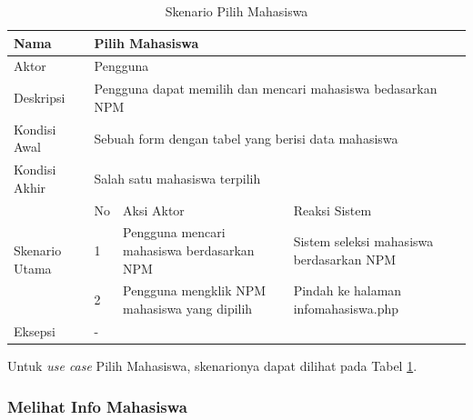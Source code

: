 \begin{table}
\centering
\caption[Tabel Skenario Pilih Mahasiswa]{Skenario Pilih Mahasiswa}
\label{tab:skenariopilih}
\begin{tabular}{|p{1.4cm}|p{0.4cm}|p{2cm}|p{2cm}|p{2cm}|p{2cm}|}
\hline
Nama & \multicolumn{5}{p{8cm}|}{Pilih Mahasiswa} \\ \hline
Aktor & \multicolumn{5}{p{8cm}|}{Pengguna} \\ \hline
Deskripsi & \multicolumn{5}{p{8cm}|}{Pengguna dapat memilih dan mencari
mahasiswa bedasarkan NPM} \\ \hline
Kondisi Awal & \multicolumn{5}{p{8cm}|}{Sebuah form dengan tabel yang berisi
data mahasiswa} \\ \hline
Kondisi Akhir & \multicolumn{5}{p{8cm}|}{Salah satu mahasiswa terpilih} \\ \hline
\multirow{3}{*}{\parbox{1.4cm}{Skenario Utama}} & No &
\multicolumn{2}{p{4cm}|}{Aksi Aktor} & \multicolumn{2}{p{4cm}|}{Reaksi Sistem}
\\ \cline{2-6}
& 1 & \multicolumn{2}{p{4cm}|}{Pengguna mencari mahasiswa berdasarkan NPM} &
\multicolumn{2}{p{4cm}|}{Sistem seleksi mahasiswa berdasarkan NPM} \\ \cline{2-6}
& 2 & \multicolumn{2}{p{4cm}|}{Pengguna mengklik NPM mahasiswa yang dipilih} &
\multicolumn{2}{p{4cm}|}{Pindah ke halaman infomahasiswa.php} \\ \hline
Eksepsi & \multicolumn{5}{p{8cm}|}{-} \\ \hline
\end{tabular}
\end{table}

Untuk {\it use case} Pilih Mahasiswa, skenarionya dapat dilihat pada Tabel
\ref{tab:skenariopilih}.

\subsubsection{Melihat Info Mahasiswa}

